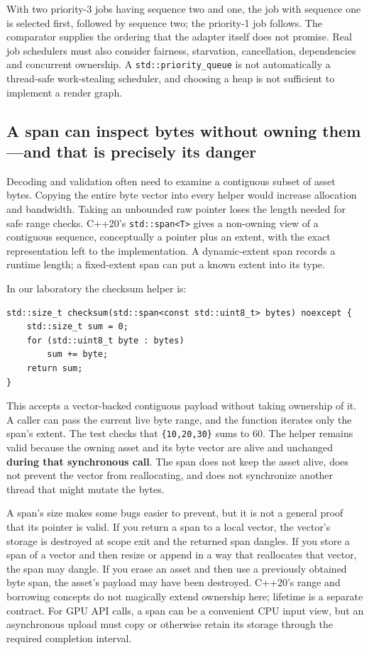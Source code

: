 With two priority-3 jobs having sequence two and one, the job with sequence one is selected first, followed by sequence two; the priority-1 job follows. The comparator supplies the ordering that the adapter itself does not promise. Real job schedulers must also consider fairness, starvation, cancellation, dependencies and concurrent ownership. A \texttt{std::priority\_queue} is not automatically a thread-safe work-stealing scheduler, and choosing a heap is not sufficient to implement a render graph.

\subsection{A span can inspect bytes without owning them---and that is precisely its danger}\label{01-foundations-i-ch006-a-span-can-inspect-bytes-without-owning-themand-that-is-precisely-its-danger}

Decoding and validation often need to examine a contiguous subset of asset bytes. Copying the entire byte vector into every helper would increase allocation and bandwidth. Taking an unbounded raw pointer loses the length needed for safe range checks. C++20's \texttt{std::span\textless{}T\textgreater{}} gives a non-owning view of a contiguous sequence, conceptually a pointer plus an extent, with the exact representation left to the implementation. A dynamic-extent span records a runtime length; a fixed-extent span can put a known extent into its type.

In our laboratory the checksum helper is:

\begin{verbatim}
std::size_t checksum(std::span<const std::uint8_t> bytes) noexcept {
    std::size_t sum = 0;
    for (std::uint8_t byte : bytes)
        sum += byte;
    return sum;
}
\end{verbatim}

This accepts a vector-backed contiguous payload without taking ownership of it. A caller can pass the current live byte range, and the function iterates only the span's extent. The test checks that \texttt{\{10,20,30\}} sums to 60. The helper remains valid because the owning asset and its byte vector are alive and unchanged \textbf{during that synchronous call}. The span does not keep the asset alive, does not prevent the vector from reallocating, and does not synchronize another thread that might mutate the bytes.

A span's size makes some bugs easier to prevent, but it is not a general proof that its pointer is valid. If you return a span to a local vector, the vector's storage is destroyed at scope exit and the returned span dangles. If you store a span of a vector and then resize or append in a way that reallocates that vector, the span may dangle. If you erase an asset and then use a previously obtained byte span, the asset's payload may have been destroyed. C++20's range and borrowing concepts do not magically extend ownership here; lifetime is a separate contract. For GPU API calls, a span can be a convenient CPU input view, but an asynchronous upload must copy or otherwise retain its storage through the required completion interval.


